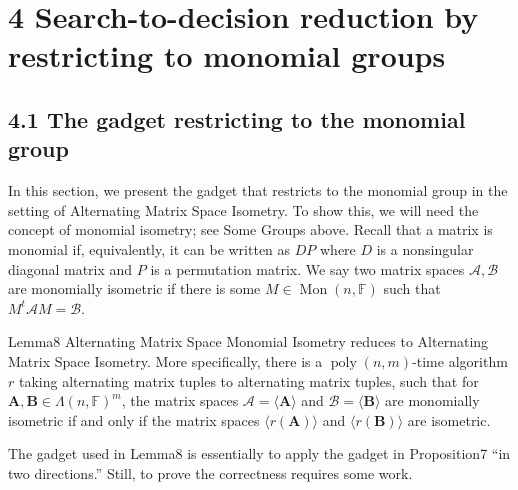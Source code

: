 \section*{4 Search-to-decision reduction by restricting to monomial groups}
\subsection*{4.1 The gadget restricting to the monomial group}
In this section, we present the gadget that restricts to the monomial group in the setting of Alternating Matrix Space Isometry. To show this, we will need the concept of monomial isometry; see Some Groups above. Recall that a matrix is monomial if, equivalently, it can be written as $DP$ where $D$ is a nonsingular diagonal matrix and $P$ is a permutation matrix. We say two matrix spaces $\mathcal A,\mathcal B$ are monomially isometric if there is some $M\in\operatorname{Mon}(n,\mathbb F)$ such that $M^t\mathcal A M=\mathcal B$.
\begin{authorclaim}{Lemma8}
Alternating Matrix Space Monomial Isometry reduces to Alternating Matrix Space Isometry. More specifically, there is a $\operatorname{poly}(n,m)$-time algorithm $r$ taking alternating matrix tuples to alternating matrix tuples, such that for $\mathbf A,\mathbf B\in\Lambda(n,\mathbb F)^m$, the matrix spaces $\mathcal A=\langle\mathbf A\rangle$ and $\mathcal B=\langle\mathbf B\rangle$ are monomially isometric if and only if the matrix spaces $\langle r(\mathbf A)\rangle$ and $\langle r(\mathbf B)\rangle$ are isometric.
\end{authorclaim}
The gadget used in Lemma8 is essentially to apply the gadget in Proposition7 ``in two directions.'' Still, to prove the correctness requires some work.
